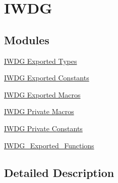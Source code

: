 \hypertarget{group___i_w_d_g}{}\section{I\+W\+DG}
\label{group___i_w_d_g}
\subsection*{Modules}
\begin{DoxyCompactItemize}
\item 
\hyperlink{group___i_w_d_g___exported___types}{I\+W\+D\+G Exported Types}
\item 
\hyperlink{group___i_w_d_g___exported___constants}{I\+W\+D\+G Exported Constants}
\item 
\hyperlink{group___i_w_d_g___exported___macros}{I\+W\+D\+G Exported Macros}
\item 
\hyperlink{group___i_w_d_g___private___macros}{I\+W\+D\+G Private Macros}
\item 
\hyperlink{group___i_w_d_g___private___constants}{I\+W\+D\+G Private Constants}
\item 
\hyperlink{group___i_w_d_g___exported___functions}{I\+W\+D\+G\+\_\+\+Exported\+\_\+\+Functions}
\end{DoxyCompactItemize}


\subsection{Detailed Description}
